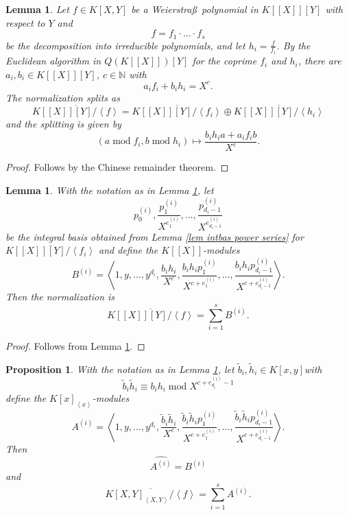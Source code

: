 \documentclass[a4paper,11pt]{amsart}%
\theoremstyle{definition}
\theoremstyle{plain}
\newtheorem{proposition}[defn]{Proposition}
\newtheorem{lemma}[defn]{Lemma}
\theoremstyle{remark}
\begin{document}
\begin{lemma}
\label{lem split}Let $f\in K[X,Y]$ be a Weierstra\ss \ polynomial in
$K[[X]][Y]$ with respect to $Y$ and
\[
f=f_{1}\cdot\ldots\cdot f_{s}%
\]
be the decomposition into irreducible polynomials, and let $h_{i}=\frac
{f}{f_{i}}$. By the Euclidean algorithm in $Q(K[[X]])[Y]$ for the coprime
$f_{i}$ and $h_{i}$, there are $a_{i},b_{i}\in K[[X]][Y]$, $c\in\mathbb{N}$
with%
\[
a_{i}f_{i}+b_{i}h_{i}=X^{c}\text{.}%
\]
The normalization splits as%
\[
\overline{K[[X]][Y]/\left\langle f\right\rangle }=\overline
{K[[X]][Y]/\left\langle f_{i}\right\rangle }\oplus\overline
{K[[X]][Y]/\left\langle h_{i}\right\rangle }%
\]
and the splitting is given by%
\[
(a\operatorname{mod}f_{i},b\operatorname{mod}h_{i})\mapsto\frac{b_{i}%
h_{i}a+a_{i}f_{i}b}{X^{c}}\text{.}%
\]

\end{lemma}

\begin{proof}
Follows by the Chinese remainder theorem.
\end{proof}

\begin{lemma}
\label{lem complete split}With the notation as in Lemma \ref{lem split}, let
\[
p_{0}^{(i)},\frac{p_{1}^{(i)}}{X^{e_{1}^{(i)}}},\ldots,\frac{p_{d_{i}-1}%
^{(i)}}{X^{e_{d_{i}-1}^{(i)}}}%
\]
be the integral basis obtained from Lemma \ref{lem intbas power series} for
$\overline{K[[X]][Y]/\left\langle f_{i}\right\rangle }$ and define the
$K[[X]]$-modules%
\[
B^{(i)}=\left\langle 1,y,\dots, y^{d_i}, \frac{b_{i}h_{i}}{X^{c}},\frac{b_{i}h_{i}p_{1}^{(i)}%
}{X^{c+e_{1}^{(i)}}},\ldots,\frac{b_{i}h_{i}p_{d_{i}-1}^{(i)}}{X^{c+e_{d_{i}%
-1}^{(i)}}}\right\rangle \text{.}%
\]
Then the normalization is
\[
\overline{K[[X]][Y]/\left\langle f\right\rangle }=\sum_{i=1}^{s}%
B^{(i)}\text{.}%
\]

\end{lemma}

\begin{proof}
Follows from Lemma \ref{lem split}.
\end{proof}

\begin{proposition}
\label{prop semilocal}With the notation as in Lemma \ref{lem complete split},
let $\tilde{b}_{i},\tilde{h}_{i}\in K[x,y]$with%
\[
\tilde{b}_{i}\tilde{h}_{i}\equiv b_{i}h_{i}\operatorname{mod}X^{c+e_{d_{i}%
}^{(i)}-1}%
\]
define the $K[x]_{\left\langle x\right\rangle }$-modules%
\[
A^{(i)}=\left\langle 1,y,\dots, y^{d_i},\frac{\tilde{b}_{i}\tilde{h}_{i}}{X^{c}},\frac{\tilde
{b}_{i}\tilde{h}_{i}p_{1}^{(i)}}{X^{c+e_{1}^{(i)}}},\ldots,\frac{\tilde{b}%
_{i}\tilde{h}_{i}p_{d_{i}-1}^{(i)}}{X^{c+e_{d_{i}-1}^{(i)}}}\right\rangle
\text{.}%
\]
Then%
\[
\widehat{A^{(i)}}=B^{(i)}%
\]
and%
\[
\overline{K[X,Y]_{\left\langle X,Y\right\rangle }/\left\langle f\right\rangle
}=\sum_{i=1}^{s}A^{(i)}\text{.}%
\]

\end{proposition}
\end{document}
